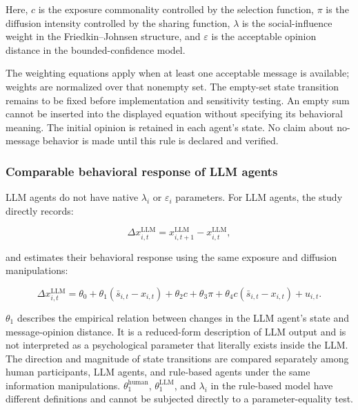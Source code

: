 \documentclass[11pt,a4paper]{article}
\begin{document}
Here, $c$ is the exposure commonality controlled by the selection function, $\pi$ is the diffusion intensity controlled by the sharing function, $\lambda$ is the social-influence weight in the Friedkin--Johnsen structure, and $\varepsilon$ is the acceptable opinion distance in the bounded-confidence model.

The weighting equations apply when at least one acceptable message is available; weights are normalized over that nonempty set. The empty-set state transition remains to be fixed before implementation and sensitivity testing. An empty sum cannot be inserted into the displayed equation without specifying its behavioral meaning. The initial opinion is retained in each agent's state. No claim about no-message behavior is made until this rule is declared and verified.

\subsubsection{Comparable behavioral response of LLM agents}

LLM agents do not have native $\lambda_i$ or $\varepsilon_i$ parameters. For LLM agents, the study directly records:

\begin{equation*}
\Delta x^{\text{LLM}}_{i,t}
=
x^{\text{LLM}}_{i,t+1}
-
x^{\text{LLM}}_{i,t},
\end{equation*}

and estimates their behavioral response using the same exposure and diffusion manipulations:

\begin{equation*}
\Delta x^{\text{LLM}}_{i,t}
=
\theta_0
+
\theta_1(\bar s_{i,t}-x_{i,t})
+
\theta_2c
+
\theta_3\pi
+
\theta_4c(\bar s_{i,t}-x_{i,t})
+
u_{i,t}.
\end{equation*}

$\theta_1$ describes the empirical relation between changes in the LLM agent's state and message-opinion distance. It is a reduced-form description of LLM output and is not interpreted as a psychological parameter that literally exists inside the LLM. The direction and magnitude of state transitions are compared separately among human participants, LLM agents, and rule-based agents under the same information manipulations. $\theta_1^{\text{human}}$, $\theta_1^{\text{LLM}}$, and $\lambda_i$ in the rule-based model have different definitions and cannot be subjected directly to a parameter-equality test.
\end{document}
